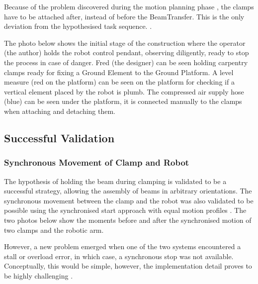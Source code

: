 Because of the problem discovered during the motion planning phase , the clamps have to be attached after, instead of before the BeamTransfer. This is the only deviation from the hypothesised task sequence. . 

The photo below shows the initial stage of the construction where the operator (the author) holds the robot control pendant, observing diligently, ready to stop the process in case of danger. Fred (the designer) can be seen holding carpentry clamps ready for fixing a Ground Element to the Ground Platform. A level measure (red on the platform) can be seen on the platform for checking if a vertical element placed by the robot is plumb. The compressed air supply hose (blue) can be seen under the platform, it is connected manually to the clamps when attaching and detaching them.

\subsection{Successful Validation}
\label{subsection:exploration-2-successful-validation}

\subsubsection{Synchronous Movement of Clamp and Robot}
\label{subsubsection:exploration-2-syncronous-movement-of-clamp-and-robot}

The hypothesis of holding the beam during clamping  is validated to be a successful strategy, allowing the assembly of beams in arbitrary orientations. The synchronous movement between the clamp and the robot was also validated to be possible using the synchronised start approach with equal motion profiles . The two photos below show the moments before and after the synchronised motion of two clamps and the robotic arm.
 
However, a new problem emerged when one of the two systems encountered a stall or overload error, in which case, a synchronous stop was not available. Conceptually, this would be simple, however, the implementation detail proves to be highly challenging .

